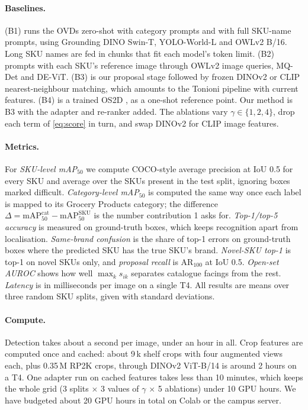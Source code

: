 \documentclass[10pt,twocolumn,letterpaper]{article}
\begin{document}
\paragraph{Baselines.} (B1) runs the OVDs zero-shot with category prompts and with full SKU-name prompts, using Grounding DINO Swin-T, YOLO-World-L and OWLv2 B/16. Long SKU names are fed in chunks that fit each model's token limit. (B2) prompts with each SKU's reference image through OWLv2 image queries, MQ-Det and DE-ViT. (B3) is our proposal stage followed by frozen DINOv2 or CLIP nearest-neighbour matching, which amounts to the Tonioni pipeline \cite{tonioni2018pipeline} with current features. (B4) is a trained OS2D \cite{osokin2020os2d}, as a one-shot reference point. Our method is B3 with the adapter and re-ranker added. The ablations vary $\gamma\in\{1,2,4\}$, drop each term of \cref{eq:score} in turn, and swap DINOv2 for CLIP image features.

\paragraph{Metrics.} For \emph{SKU-level mAP$_{50}$} we compute COCO-style average precision at IoU 0.5 for every SKU and average over the SKUs present in the test split, ignoring boxes marked difficult. \emph{Category-level mAP$_{50}$} is computed the same way once each label is mapped to its Grocery Products category; the difference $\Delta=\text{mAP}^{\text{cat}}_{50}-\text{mAP}^{\text{SKU}}_{50}$ is the number contribution 1 asks for. \emph{Top-1/top-5 accuracy} is measured on ground-truth boxes, which keeps recognition apart from localisation. \emph{Same-brand confusion} is the share of top-1 errors on ground-truth boxes where the predicted SKU has the true SKU's brand. \emph{Novel-SKU top-1} is top-1 on novel SKUs only, and \emph{proposal recall} is AR$_{100}$ at IoU 0.5. \emph{Open-set AUROC} shows how well $\max_k s_{ik}$ separates catalogue facings from the rest. \emph{Latency} is in milliseconds per image on a single T4. All results are means over three random SKU splits, given with standard deviations.

\paragraph{Compute.} Detection takes about a second per image, under an hour in all. Crop features are computed once and cached: about 9\,k shelf crops with four augmented views each, plus 0.35\,M RP2K crops, through DINOv2 ViT-B/14 is around 2 hours on a T4. One adapter run on cached features takes less than 10 minutes, which keeps the whole grid (3 splits $\times$ 3 values of $\gamma$ $\times$ 5 ablations) under 10 GPU hours. We have budgeted about 20 GPU hours in total on Colab or the campus server.
\end{document}

